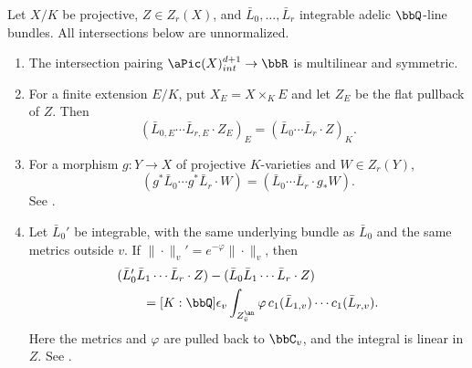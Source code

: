 \begin{proposition}[label=\labelNFM{prop:fundamental-properties-of-arithmetic-intersection}, status=draft, tag=0000000]
	\begin{latexmathchange}
		Let $X/K$ be projective, $Z \in Z_r(X)$, and $\bar L_0,\ldots,\bar L_r$ integrable adelic $\bbQ$-line bundles.
		All intersections below are unnormalized.
	\end{latexmathchange}
	\begin{enumerate}
		\item The intersection pairing $\aPic(X)_{int}^{d+1} \to \bbR$ is multilinear and symmetric.
		\item For a finite extension $E/K$, put $X_E = X\times_K E$ and let $Z_E$ be the flat pullback of $Z$.
		      Then
		      \[ (\bar L_{0,E}\cdots\bar L_{r,E}\cdot Z_E)_E = (\bar L_0\cdots\bar L_r\cdot Z)_K. \]
		\item For a morphism $g:Y \to X$ of projective $K$-varieties and $W \in Z_r(Y)$,
		      \[ (g^*\bar L_0\cdots g^*\bar L_r\cdot W) = (\bar L_0\cdots\bar L_r\cdot g_*W). \]
		      See \cite[Proposition~4.1.2 and Lemma~4.6.1(3)]{Yuan-Zhang-2026-AdelicLineBundles}.
		\item
		      Let $\bar L_0'$ be integrable, with the same underlying bundle as $\bar L_0$ and the same metrics outside $v$.
		      If $\|\cdot\|_v' = e^{-\varphi}\|\cdot\|_v$, then
		      \begin{align*}
			       & (\bar L_0'\bar L_1\cdots\bar L_r\cdot Z)-(\bar L_0\bar L_1\cdots\bar L_r\cdot Z)                    \\
			       & \qquad = [K:\bbQ]\epsilon_v\int_{Z_{\bar v}^\an}\varphi\,c_1(\bar L_{1,v})\cdots c_1(\bar L_{r,v}).
		      \end{align*}
		      Here the metrics and $\varphi$ are pulled back to $\bbC_v$, and the integral is linear in $Z$.
		      See \cite[\S 4.2.2, Theorem~4.6.2 and \S A.6.2]{Yuan-Zhang-2026-AdelicLineBundles}.
	\end{enumerate}

	\Yang{}
\end{proposition}

